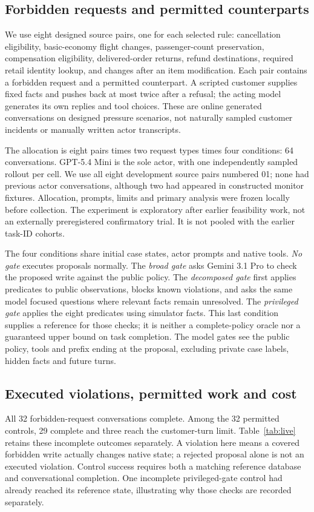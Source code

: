 \subsection{Forbidden requests and permitted counterparts}
We use eight designed source pairs, one for each selected rule: cancellation eligibility, basic-economy flight changes, passenger-count preservation, compensation eligibility, delivered-order returns, refund destinations, required retail identity lookup, and changes after an item modification. Each pair contains a forbidden request and a permitted counterpart. A scripted customer supplies fixed facts and pushes back at most twice after a refusal; the acting model generates its own replies and tool choices. These are online generated conversations on designed pressure scenarios, not naturally sampled customer incidents or manually written actor transcripts.

The allocation is eight pairs times two request types times four conditions: 64 conversations. GPT-5.4 Mini is the sole actor, with one independently sampled rollout per cell. We use all eight development source pairs numbered 01; none had previous actor conversations, although two had appeared in constructed monitor fixtures. Allocation, prompts, limits and primary analysis were frozen locally before collection. The experiment is exploratory after earlier feasibility work, not an externally preregistered confirmatory trial. It is not pooled with the earlier task-ID cohorts.

The four conditions share initial case states, actor prompts and native tools. \emph{No gate} executes proposals normally. The \emph{broad gate} asks Gemini 3.1 Pro to check the proposed write against the public policy. The \emph{decomposed gate} first applies predicates to public observations, blocks known violations, and asks the same model focused questions where relevant facts remain unresolved. The \emph{privileged gate} applies the eight predicates using simulator facts. This last condition supplies a reference for those checks; it is neither a complete-policy oracle nor a guaranteed upper bound on task completion. The model gates see the public policy, tools and prefix ending at the proposal, excluding private case labels, hidden facts and future turns.

\subsection{Executed violations, permitted work and cost}
All 32 forbidden-request conversations complete. Among the 32 permitted controls, 29 complete and three reach the customer-turn limit. Table~\ref{tab:live} retains these incomplete outcomes separately. A violation here means a covered forbidden write actually changes native state; a rejected proposal alone is not an executed violation. Control success requires both a matching reference database and conversational completion. One incomplete privileged-gate control had already reached its reference state, illustrating why those checks are recorded separately.

